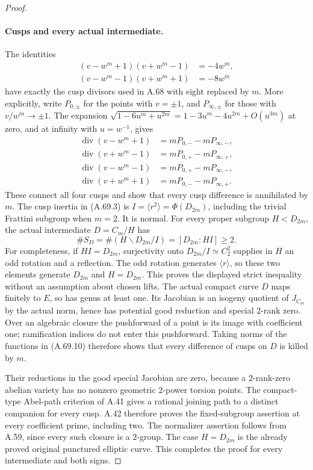 \begin{proof}
\paragraph{Cusps and every actual intermediate.}
The identities
\[
 \begin{aligned}
 (v-w^m+1)(v+w^m-1)&=-4w^m,\\
 (v-w^m-1)(v+w^m+1)&=-8w^m
 \end{aligned}                                           \tag{A.69.10}
\]
have exactly the cusp divisors used in A.68 with eight replaced
by \(m\). More explicitly, write \(P_{0,\pm}\) for the points
with \(v=\pm1\), and \(P_{\infty,\pm}\) for those with
\(v/w^m\to\pm1\). The expansion
\(\sqrt{1-6u^m+u^{2m}}=1-3u^m-4u^{2m}+O(u^{3m})\)
at zero, and at infinity with \(u=w^{-1}\), gives
\[
 \begin{aligned}
 \operatorname{div}(v-w^m+1)&=mP_{0,-}-mP_{\infty,-},\\
 \operatorname{div}(v+w^m-1)&=mP_{0,+}-mP_{\infty,+},\\
 \operatorname{div}(v-w^m-1)&=mP_{0,+}-mP_{\infty,-},\\
 \operatorname{div}(v+w^m+1)&=mP_{0,-}-mP_{\infty,+}.
 \end{aligned}                                             \tag{A.69.12}
\]
These connect all four cusps and show that every cusp difference
is annihilated by \(m\).
The cusp inertia in (A.69.3) is
\(I=\langle r^2\rangle=\Phi(D_{2m})\), including the trivial
Frattini subgroup when \(m=2\). It is normal. For every proper
subgroup \(H<D_{2m}\), the actual intermediate
\(D=C_m/H\) has
\[
        \#S_D=\#(H\backslash D_{2m}/I)
                 =[D_{2m}:HI]\ge2.                 \tag{A.69.11}
\]
For completeness, if \(HI=D_{2m}\), surjectivity onto
\(D_{2m}/I\simeq C_2^2\) supplies in \(H\) an odd rotation
and a reflection. The odd rotation generates \(\langle r\rangle\),
so these two elements generate \(D_{2m}\) and \(H=D_{2m}\).
This proves the displayed strict inequality without an assumption
about chosen lifts. The actual compact curve \(D\) maps finitely to
\(E\), so has genus at least one. Its Jacobian is an isogeny
quotient of \(J_{C_m}\) by the actual norm, hence has potential
good reduction and special \(2\)-rank zero. Over an algebraic
closure the pushforward of a point is its image with coefficient
one; ramification indices do not enter this pushforward.
Taking norms of the functions in (A.69.10) therefore shows that
every difference of cusps on \(D\) is killed by \(m\).

Their reductions in the good special Jacobian are zero, because
a \(2\)-rank-zero abelian variety has no nonzero geometric
\(2\)-power torsion points. The compact-type Abel-path criterion
of A.41 gives a rational joining path to a distinct companion
for every cusp. A.42 therefore proves the fixed-subgroup
assertion at every coefficient prime, including two. The
normalizer assertion follows from A.59, since every such
closure is a \(2\)-group. The case \(H=D_{2m}\) is the already
proved original punctured elliptic curve. This completes the
proof for every intermediate and both signs.
\end{proof}
